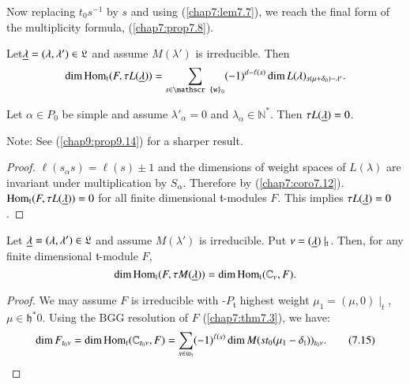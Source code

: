 Now replacing $t_0 s^{-1}$ by $s$ and using (\ref{chap7:lem7.7}), we reach the final
form of the multiplicity formula, (\ref{chap7:prop7.8}). 

\setcounter{prop}{11}
\begin{coro}\label{chap7:coro7.12}
Let\pageoriginale $\underline{\lambda} = (\lambda, \lambda') \in \mathfrak{L}$
and assume $M(\lambda')$ is irreducible. Then 
$$
\dim \Hom_\mathfrak{t} (F, \tau L(\u{\lambda})) = \sum\limits_{s \in
  \mathscr{w}_0}  (-1)^{d-\ell(s)} \dim L(\lambda)_{s(\mu + \delta_0)
  - \lambda'}. 
$$
\end{coro}

\begin{coro}\label{chap7:coro7.13}
Let $\alpha \in P_0$ be simple and assume $\lambda'_\alpha =0$ and
$\lambda_\alpha \in \mathbb{N}^*$. Then $\tau L(\underline{\lambda}) = 0$. 
\end{coro}

Note: See (\ref{chap9:prop9.14}) for a sharper result. 

\begin{proof}
$\ell(s_\alpha s) = \ell(s) \pm 1$ and the dimensions of weight spaces
  of $L(\lambda)$ are invariant under multiplication by
  $S_\alpha$. Therefore by (\ref{chap7:coro7.12}). $\Hom_\mathfrak{t}
  (F,\break \tau   L(\u{\lambda})) = 0$ for all finite dimensional 
  $\mathfrak{t}$-modules $F$. This implies $\tau L(\underline{\lambda}) = 0$. 
\end{proof}

\begin{coro}\label{chap7:coro7.14}
Let $\underline{\lambda} = (\lambda, \lambda') \in \mathfrak{L}$ and assume
$M(\lambda')$ is irreducible. Put $\nu = (\underline{\lambda})
\mid_\mathfrak{t}$. Then, for any finite dimensional
$\mathfrak{t}$-module $F$,
$$
\dim \operatorname{Hom}_\mathfrak{t} (F, \tau M(\underline{\mathfrak{\lambda}})) = \dim
\operatorname{Hom}_\mathfrak{t} (\mathbb{C}_\nu, F). 
$$
\end{coro}

\begin{proof}
We may assume $F$ is irreducible with -$P_\mathfrak{t}$ highest weight
$\mu_1 = (\mu, 0) \mid_t$, $\mu \in \mathfrak{h}^*0$. Using the BGG
resolution of $F$ (\ref{chap7:thm7.3}), we have:
\begin{equation*}
\dim F_{t_0 \nu} = \dim \operatorname{Hom}_\mathfrak{t} (\mathbb{C}_{t_0 \nu}, F) =
\sum\limits_{s \in \mathfrak{w}_\mathfrak{t}} (-1)^{\ell(s)} \dim M
(st_0 (\mu_1 - \delta_\mathfrak{t}))_{t_0 \nu}. 
\tag{7.15}\label{eq7.15}
\end{equation*}
\end{proof}


